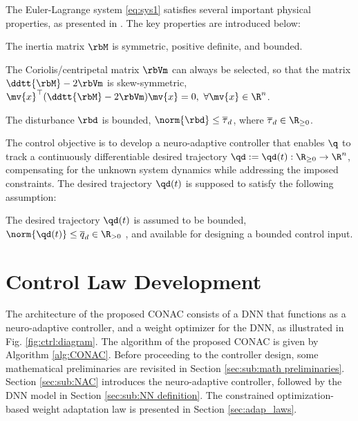 \documentclass[journal]{IEEEtran}
\begin{document}
The Euler-Lagrange system \eqref{eq:sys1} satisfies several important physical properties, as presented in \cite[Chap. 3, Tab. 3.2.1]{Lewis:1998aa}. 
The key properties are introduced below:
\begin{prop} 
    The inertia matrix $\rbM$ is symmetric, positive definite, and bounded.
    \label{prop:M}
\end{prop}

\begin{prop} 
    The Coriolis/centripetal matrix $\rbVm$ can always be selected, so that the matrix $\ddtt{\rbM}-2\rbVm$ is skew-symmetric, \ie $\mv{x}^\top(\ddtt{\rbM}-2\rbVm)\mv{x}=0,\ \forall \mv{x}\in\R^n$.
    \label{prop:skew}
\end{prop}

\begin{prop}
    The disturbance $\rbd$ is bounded, \ie $\norm{\rbd}\le \overline\tau_d$, where $\overline\tau_d\in\R_{\ge0}$.
    \label{prop:dis_bound}
\end{prop}

The control objective is to develop a neuro-adaptive controller that enables $\q$ to track a continuously differentiable desired trajectory $\qd:=\qd(t): \R_{\ge0} \to \R^n$, compensating for the unknown system dynamics while addressing the imposed constraints.
The desired trajectory $\qd(t)$ is supposed to satisfy the following assumption:
\begin{assum}
    The desired trajectory $\qd(t)$ is assumed to be bounded, \ie $\norm{\qd(t)}\le \overline{q}_d\in\R_{>0}$ , and available for designing a bounded control input.
    \label{assum:feasible}
\end{assum}

\section{Control Law Development}\label{sec:ctrl design}

The architecture of the proposed CONAC consists of a DNN that functions as a neuro-adaptive controller, and a weight optimizer for the DNN, as illustrated in Fig. \ref{fig:ctrl:diagram}.
The algorithm of the proposed CONAC is given by Algorithm \ref{alg:CONAC}. 
Before proceeding to the controller design, some mathematical preliminaries are revisited in Section \ref{sec:sub:math preliminaries}. 
Section \ref{sec:sub:NAC} introduces the neuro-adaptive controller, followed by the DNN model in Section \ref{sec:sub:NN definition}. 
The constrained optimization-based weight adaptation law is presented in Section \ref{sec:adap_laws}.
\end{document}
